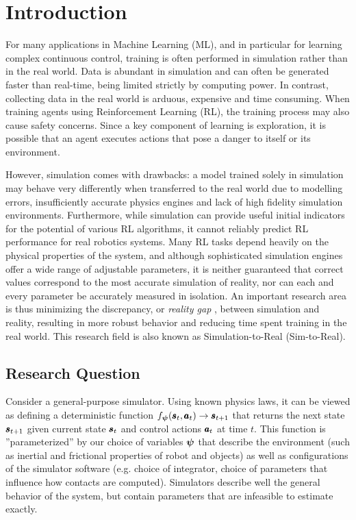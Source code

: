 \chapter{Introduction}
\label{introduction}
For many applications in Machine Learning (ML), and in particular for learning complex continuous control, training is often performed in simulation rather than in the real world. Data is abundant in simulation and can often be generated faster than real-time, being limited strictly by computing power. In contrast, collecting data in the real world is arduous, expensive and time consuming. When training agents using Reinforcement Learning (RL), the training process may also cause safety concerns. Since a key component of learning is exploration, it is possible that an agent executes actions that pose a danger to itself or its environment.

However, simulation comes with drawbacks: a model trained solely in simulation may behave very differently when transferred to the real world due to modelling errors, insufficiently accurate physics engines and lack of high fidelity simulation environments. Furthermore, while simulation can provide useful initial indicators for the potential of various RL algorithms, it cannot reliably predict RL performance for real robotics systems. Many RL tasks depend heavily on the physical properties of the system, and although sophisticated simulation engines offer a wide range of adjustable parameters, it is neither guaranteed that correct values correspond to the most accurate simulation of reality, nor can each and every parameter be accurately measured in isolation. An important research area is thus minimizing the discrepancy, or \emph{reality gap} \parencite{Jakobi1995NoiseAT}, between simulation and reality, resulting in more robust behavior and reducing time spent training in the real world. This research field is also known as Simulation-to-Real (Sim-to-Real).

\section{Research Question}

Consider a general-purpose simulator. Using known physics laws, it can be viewed as defining a deterministic function $f_{\boldsymbol{\psi}}(\pmb{s}_t, \pmb{a}_t) \rightarrow \pmb{s}_{t+1}$ that returns the next state $\pmb{s}_{t+1}$ given current state $\pmb{s}_t$ and control actions $\pmb{a}_t$ at time $t$. This function is ''parameterized'' by our choice of variables $\boldsymbol{\psi}$ that describe the environment (such as inertial and frictional properties of robot and objects) as well as configurations of the simulator software (e.g. choice of integrator, choice of parameters that influence how contacts are computed). Simulators describe well the general behavior of the system, but contain parameters that are infeasible to estimate exactly.%

